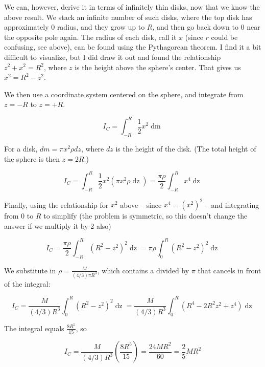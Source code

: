 \documentclass[8.01x]{subfiles}
\begin{document}
We can, however, derive it in terms of infinitely thin disks, now that we know the  above result. We stack an infinite number of such disks, where the top disk has approximately 0 radius, and they grow up to $R$, and then go back down to 0 near the opposite pole again. The radius of each disk, call it $x$ (since $r$ could be confusing, see above), can be found using the Pythagorean theorem. I find it a bit difficult to visualize, but I did draw it out and found the relationship $z^2 + x^2 = R^2$, where $z$ is the height above the sphere's center. That gives us $x^2 = R^2 - z^2$.

We then use a coordinate system centered on the sphere, and integrate from $z = -R$ to $z = +R$.

\begin{equation}
I_C = \int_{-R}^{R} \frac{1}{2} x^2 \mathop{dm}
\end{equation}

For a disk, $dm = \pi x^2 \rho dz$, where $dz$ is the height of the disk. (The total height of the sphere is then $z = 2R$.)

\begin{equation}
I_C = \int_{-R}^{R} \frac{1}{2} x^2 (\pi x^2 \rho \mathop{dz}) = \frac{\pi \rho}{2} \int_{-R}^{R} x^4 \mathop{dz}
\end{equation}

Finally, using the relationship for $x^2$ above -- since $x^4 = (x^2)^2$ -- and integrating from $0$ to $R$ to simplify (the problem is symmetric, so this doesn't change the answer if we multiply it by 2 also)

\begin{equation}
I_C = \frac{\pi \rho}{2} \int_{-R}^{R} (R^2 - z^2)^2 \mathop{dz} = \pi \rho \int_{0}^{R} (R^2 - z^2)^2 \mathop{dz}
\end{equation}

We substitute in $\displaystyle \rho = \frac{M}{(4/3) \pi R^3}$, which contains a divided by $\pi$ that cancels in front of the integral:

\begin{equation}
I_C = \frac{M}{(4/3) R^3} \int_{0}^{R} (R^2 - z^2)^2 \mathop{dz} = \frac{M}{(4/3) R^3} \int_{0}^{R} \left(R^4 - 2 R^2 z^2 + z^4 \right)\mathop{dz}
\end{equation}

The integral equals $\displaystyle \frac{8 R^5}{15}$, so

\begin{equation}
I_C = \frac{M}{(4/3) R^3} \left(\frac{8 R^5}{15}\right) = \frac{24 M R^2}{60} = \frac{2}{5} M R^2
\end{equation}
\end{document}
